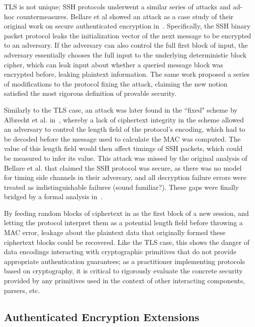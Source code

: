 TLS is not unique; SSH protocols underwent a similar series of attacks and ad-hoc countermeasures.  Bellare et al showed an attack as a case study of 
their original work on secure authenticated encryption in~\cite{Bellare2004}.  Specifically, the SSH binary packet protocol leaks the initialization 
vector of the next message to be encrypted to an adversary.  If the adversary can also control the full first block of input, the adversary 
essentially chooses the full input to the underlying deterministic block cipher, which can leak input about whether a queried message block was 
encrypted before, leaking plaintext information. The same work proposed a series of modifications to the protocol fixing the attack, claiming the new 
notion satisfied the most rigorous definition of provable security.

Similarly to the TLS case, an attack was later found in the ``fixed" scheme by Albrecht et al. in~\cite{Albrecht2009}, whereby a lack of ciphertext 
integrity in the scheme allowed an adversary to control the length field of the protocol's encoding, which had to be decoded before the message used 
to calculate the MAC was computed.  The value of this length field would then affect timings of SSH packets, which could be measured to infer its 
value.  This attack was missed by the original analysis of Bellare et al. that claimed the SSH protocol was secure, as there was no model for timing 
side channels in their adversary, and all decryption failure errors were treated as indistinguishable failures (sound familiar?).  These gaps were 
finally bridged by a formal analysis in~\cite{Paterson2010}.

By feeding random blocks of ciphertext in as the first block of a new session, and letting the protocol interpret them as a potential length field 
before throwing a MAC error, leakage about the plaintext data that originally formed these ciphertext blocks could be recovered.  Like the TLS case, 
this shows the danger of data encodings interacting with cryptographic primitives that do not provide appropriate authentication guarantees; as a 
practitioner implementing protocols based on cryptography, it is critical to rigorously evaluate the concrete security provided by any primitives used 
in the context of other interacting components, parsers, etc.

\subsection{Authenticated Encryption Extensions}

